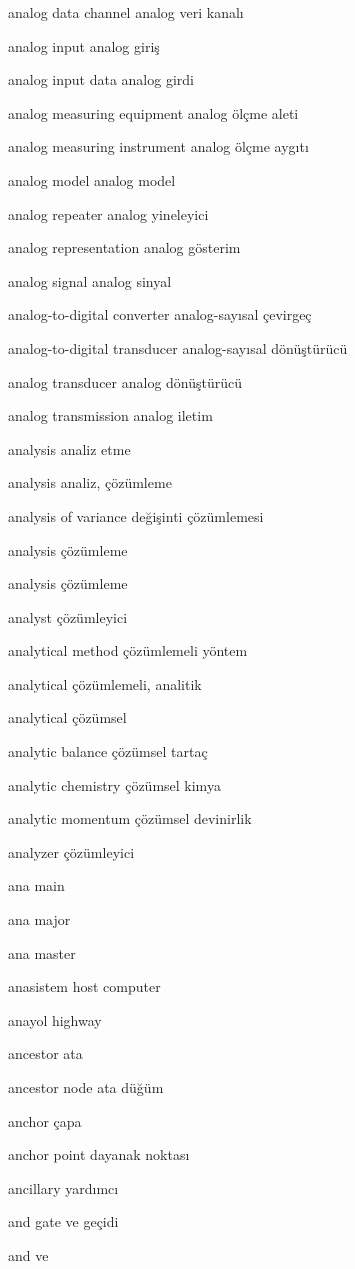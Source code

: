 \documentclass[12pt,fleqn]{article}\usepackage{../../common}
\begin{document}
analog data channel analog veri kanalı

analog input analog giriş

analog input data analog girdi

analog measuring equipment analog ölçme aleti

analog measuring instrument analog ölçme aygıtı

analog model analog model

analog repeater analog yineleyici

analog representation analog gösterim

analog signal analog sinyal

analog-to-digital converter analog-sayısal çevirgeç

analog-to-digital transducer analog-sayısal dönüştürücü

analog transducer analog dönüştürücü

analog transmission analog iletim

analysis analiz etme

analysis analiz, çözümleme

analysis of variance değişinti çözümlemesi

analysis çözümleme

analysis çözümleme

analyst çözümleyici

analytical method çözümlemeli yöntem

analytical çözümlemeli, analitik

analytical çözümsel

analytic balance çözümsel tartaç

analytic chemistry çözümsel kimya

analytic momentum çözümsel devinirlik

analyzer çözümleyici

ana main

ana major

ana master

anasistem host computer

anayol highway

ancestor ata

ancestor node ata düğüm

anchor çapa

anchor point dayanak noktası

ancillary yardımcı

and gate ve geçidi

and ve
\end{document}

